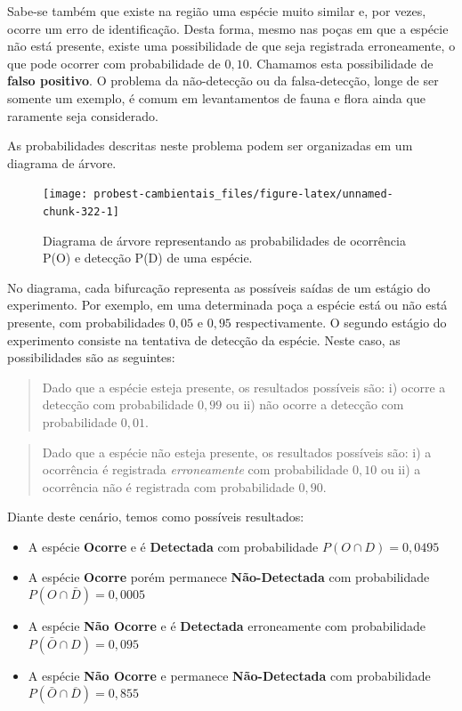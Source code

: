 \documentclass[
]{book}
\begin{document}
Sabe-se também que existe na região uma espécie muito similar e, por vezes, ocorre um erro de identificação. Desta forma, mesmo nas poças em que a espécie não está presente, existe uma possibilidade de que seja registrada erroneamente, o que pode ocorrer com probabilidade de \(0,10\). Chamamos esta possibilidade de \textbf{falso positivo}. O problema da não-detecção ou da falsa-detecção, longe de ser somente um exemplo, é comum em levantamentos de fauna e flora ainda que raramente seja considerado.

As probabilidades descritas neste problema podem ser organizadas em um diagrama de árvore.

\begin{figure}

{\centering \texttt{[image: probest-cambientais\_files/figure-latex/unnamed-chunk-322-1]} 

}

\caption{Diagrama de árvore representando as probabilidades de ocorrência P(O) e detecção P(D) de uma espécie.}\label{fig:unnamed-chunk-322}
\end{figure}

No diagrama, cada bifurcação representa as possíveis saídas de um estágio do experimento. Por exemplo, em uma determinada poça a espécie está ou não está presente, com probabilidades \(0,05\) e \(0,95\) respectivamente. O segundo estágio do experimento consiste na tentativa de detecção da espécie. Neste caso, as possibilidades são as seguintes:

\begin{quote}
Dado que a espécie esteja presente, os resultados possíveis são: i) ocorre a detecção com probabilidade \(0,99\) ou ii) não ocorre a detecção com probabilidade \(0,01\).
\end{quote}

\begin{quote}
Dado que a espécie não esteja presente, os resultados possíveis são: i) a ocorrência é registrada \emph{erroneamente} com probabilidade \(0,10\) ou ii) a ocorrência não é registrada com probabilidade \(0,90\).
\end{quote}

Diante deste cenário, temos como possíveis resultados:

\begin{itemize}
\item
  A espécie \textbf{Ocorre} e é \textbf{Detectada } com probabilidade \(P(O \cap D) = 0,0495\)
\item
  A espécie \textbf{Ocorre } porém permanece \textbf{Não-Detectada } com probabilidade \(P(O \cap \bar{D}) = 0,0005\)
\item
  A espécie \textbf{Não Ocorre } e é \textbf{Detectada } erroneamente com probabilidade \(P(\bar{O} \cap D) = 0,095\)
\item
  A espécie \textbf{Não Ocorre } e permanece \textbf{Não-Detectada } com probabilidade \(P(\bar{O} \cap\overline{D}) = 0,855\)
\end{itemize}
\end{document}
